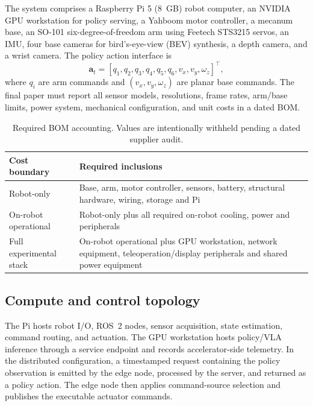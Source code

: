 \documentclass[letterpaper,10pt,conference]{ieeeconf}
\begin{document}
The system comprises a Raspberry Pi 5 (8~GB) robot computer, an NVIDIA GPU workstation for policy serving, a Yahboom motor controller, a mecanum base, an SO-101 six-degree-of-freedom arm using Feetech STS3215 servos, an IMU, four base cameras for bird's-eye-view (BEV) synthesis, a depth camera, and a wrist camera. The policy action interface is
\begin{equation}
\mathbf{a}_t = [q_1, q_2, q_3, q_4, q_5, q_6, v_x, v_y, \omega_z]^\top,
\end{equation}
where $q_i$ are arm commands and $(v_x,v_y,\omega_z)$ are planar base commands. The final paper must report all sensor models, resolutions, frame rates, arm/base limits, power system, mechanical configuration, and unit costs in a dated BOM.

\begin{table}[t]
\caption{Required BOM accounting. Values are intentionally withheld pending a dated supplier audit.}
\label{tab:bom}
\centering
\small
\begin{tabular}{p{} p{}}
\toprule
Cost boundary & Required inclusions \\
\midrule
Robot-only & Base, arm, motor controller, sensors, battery, structural hardware, wiring, storage and Pi \\
On-robot operational & Robot-only plus all required on-robot cooling, power and peripherals \\
Full experimental stack & On-robot operational plus GPU workstation, network equipment, teleoperation/display peripherals and shared power equipment \\
\bottomrule
\end{tabular}
\end{table}

\subsection{Compute and control topology}

The Pi hosts robot I/O, ROS~2 nodes, sensor acquisition, state estimation, command routing, and actuation. The GPU workstation hosts policy/VLA inference through a service endpoint and records accelerator-side telemetry. In the distributed configuration, a timestamped request containing the policy observation is emitted by the edge node, processed by the server, and returned as a policy action. The edge node then applies command-source selection and publishes the executable actuator commands.
\end{document}
